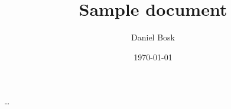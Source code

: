 \documentclass[a4paper]{article}
\author{Daniel Bosk}
\title{Sample document}
\date{\today}
\begin{document}
\maketitle
\tableofcontents

\dots
\end{document}
